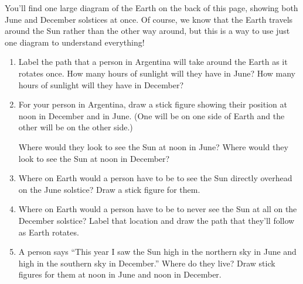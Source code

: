 \documentclass[12pt]{article}
\begin{document}
\newpage

\Large
\centerline{}
\normalsize
\rm

You'll find one large diagram of the Earth on the back of this page, showing both June and December solstices at once. Of course, we know that the Earth travels around the Sun rather than the other way around, but this is a way to use just one diagram to understand everything!

\begin{enumerate}
	\item Label the path that a person in Argentina will take around the Earth as it rotates once. How many hours of sunlight will they have in June? How many hours of sunlight will they have in December?
	
	\vspace{1in}
	
	\item For your person in Argentina, draw a stick figure showing their position at noon in December and in June. (One will be on one side of Earth and the other will be on the other side.)
	
	Where would they look to see the Sun at noon in June? Where would they look to see the Sun at noon in December?
	\vspace{0.8in}	

	\item Where on Earth would a person have to be to see the Sun directly overhead on the June solstice? Draw a stick figure for them.
	\vspace{0.8in}	
	
	\item Where on Earth would a person have to be to never see the Sun at all on the December solstice? Label that location and draw the path that they'll follow as Earth rotates.
		\vspace{0.8in}
		
	\item A person says ``This year I saw the Sun high in the northern sky in June and high in the southern sky in December.'' Where do they live? Draw stick figures for them at noon in June and noon in December.
	
\end{enumerate}
\end{document}
